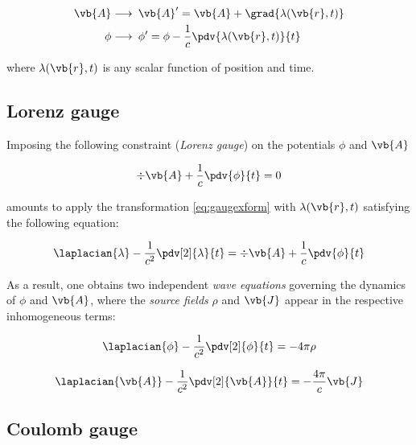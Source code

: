 \begin{equation}
\begin{aligned}
\vb{A}  &\longrightarrow \: \vb{A}' = \vb{A} + \grad{\lambda(\vb{r}, t)} \\   
\phi    &\longrightarrow \: \phi' = \phi - \frac{1}{c} \pdv{\lambda(\vb{r}, t)}{t}   
\label{eq:gaugexform}
\end{aligned}
\end{equation}

where $\lambda(\vb{r}, t)$ is any scalar function of position and time.

\subsection{Lorenz gauge}

Imposing the following constraint (\textit{Lorenz gauge}) on the potentials $\phi$ and $\vb{A}$

\begin{equation}
\div{\vb{A}} + \frac{1}{c} \pdv{\phi}{t} = 0
\label{eq:lorenzgauge} %
\end{equation}

amounts to apply the transformation \ref{eq:gaugexform} with $\lambda(\vb{r}, t)$ satisfying the following equation: 

\begin{align*}
\laplacian{\lambda} - \frac{1}{c^2} \pdv[2]{\lambda}{t} = \div{\vb{A}} + \frac{1}{c} \pdv{\phi}{t}
\end{align*}


As a result, one obtains two independent \textit{wave equations} governing the dynamics of $\phi$ and $\vb{A}$, where the \textit{source fields} $\rho$ and $\vb{J}$ appear in the respective inhomogeneous terms: 


\begin{equation}
\laplacian{\phi} - \frac{1}{c^2} \pdv[2]{\phi}{t} = - 4 \pi \rho
\label{eq:PhiWave}
\end{equation}

\begin{equation}
\laplacian{\vb{A}} - \frac{1}{c^2} \pdv[2]{\vb{A}}{t} = - \frac{4 \pi}{c} \vb{J} 
\label{eq:AWave}
\end{equation}


\subsection{Coulomb gauge}

 

 




